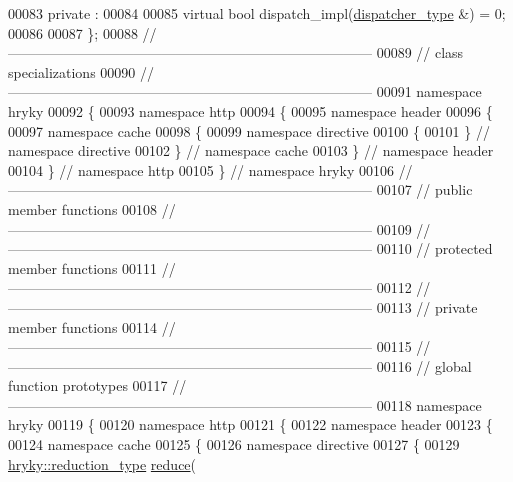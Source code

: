 \begin{DoxyCode}
00083 \textcolor{keyword}{private} :
00084 
00085     \textcolor{keyword}{virtual} \textcolor{keywordtype}{bool} dispatch\_impl(\hyperlink{classhryky_1_1http_1_1header_1_1cache_1_1directive_1_1dispatcher_1_1_base}{dispatcher_type} &) = 0;
00086 
00087 \};
00088 \textcolor{comment}{//
      ------------------------------------------------------------------------------}
00089 \textcolor{comment}{// class specializations}
00090 \textcolor{comment}{//
      ------------------------------------------------------------------------------}
00091 \textcolor{keyword}{namespace }hryky
00092 \{
00093 \textcolor{keyword}{namespace }http
00094 \{
00095 \textcolor{keyword}{namespace }header
00096 \{
00097 \textcolor{keyword}{namespace }cache
00098 \{
00099 \textcolor{keyword}{namespace }directive
00100 \{
00101 \} \textcolor{comment}{// namespace directive}
00102 \} \textcolor{comment}{// namespace cache}
00103 \} \textcolor{comment}{// namespace header}
00104 \} \textcolor{comment}{// namespace http}
00105 \} \textcolor{comment}{// namespace hryky}
00106 \textcolor{comment}{//
      ------------------------------------------------------------------------------}
00107 \textcolor{comment}{// public member functions}
00108 \textcolor{comment}{//
      ------------------------------------------------------------------------------}
00109 \textcolor{comment}{//
      ------------------------------------------------------------------------------}
00110 \textcolor{comment}{// protected member functions}
00111 \textcolor{comment}{//
      ------------------------------------------------------------------------------}
00112 \textcolor{comment}{//
      ------------------------------------------------------------------------------}
00113 \textcolor{comment}{// private member functions}
00114 \textcolor{comment}{//
      ------------------------------------------------------------------------------}
00115 \textcolor{comment}{//
      ------------------------------------------------------------------------------}
00116 \textcolor{comment}{// global function prototypes}
00117 \textcolor{comment}{//
      ------------------------------------------------------------------------------}
00118 \textcolor{keyword}{namespace }hryky
00119 \{
00120 \textcolor{keyword}{namespace }http
00121 \{
00122 \textcolor{keyword}{namespace }header
00123 \{
00124 \textcolor{keyword}{namespace }cache
00125 \{
00126 \textcolor{keyword}{namespace }directive
00127 \{
00129     \hyperlink{classhryky_1_1_intrusive_ptr}{hryky::reduction_type} \hyperlink{namespacehryky_1_1http_a08fc36a78a8e2908140fcd102829a566}{reduce}(

\end{DoxyCode}
